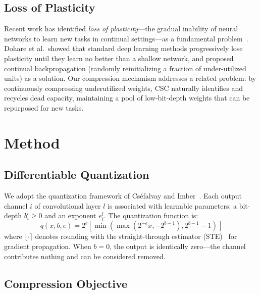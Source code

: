 \documentclass[11pt]{article}
\begin{document}
\subsection{Loss of Plasticity}

Recent work has identified \textit{loss of plasticity}---the gradual inability of neural networks to learn new tasks in continual settings---as a fundamental problem~\citep{dohare2024loss, lyle2023understanding}.
Dohare et al.\ showed that standard deep learning methods progressively lose plasticity until they learn no better than a shallow network, and proposed continual backpropagation (randomly reinitializing a fraction of under-utilized units) as a solution.
Our compression mechanism addresses a related problem: by continuously compressing underutilized weights, CSC naturally identifies and recycles dead capacity, maintaining a pool of low-bit-depth weights that can be repurposed for new tasks.

\section{Method}
\label{sec:method}

\subsection{Differentiable Quantization}

We adopt the quantization framework of Cséfalvay and Imber~\citep{csefalvay2023self}.
Each output channel $i$ of convolutional layer $l$ is associated with learnable parameters: a bit-depth $b_i^l \geq 0$ and an exponent $e_i^l$.
The quantization function is:
\begin{equation}
    q(x, b, e) = 2^e \left\lfloor \min\!\left(\max\!\left(2^{-e}x, -2^{b-1}\right), 2^{b-1} - 1\right) \right\rceil
    \label{eq:quantize}
\end{equation}
where $\lfloor \cdot \rceil$ denotes rounding with the straight-through estimator (STE)~\citep{bengio2013estimating} for gradient propagation.
When $b = 0$, the output is identically zero---the channel contributes nothing and can be considered removed.

\subsection{Compression Objective}
\end{document}
